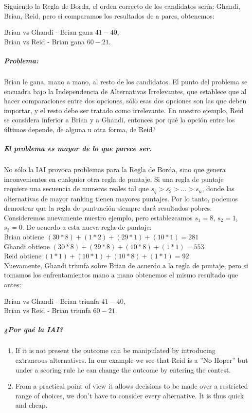 Siguiendo la Regla de Borda, el orden correcto de los candidatos sería: Ghandi, Brian, Reid, pero si comparamos los resultados de a pares, obtenemos:
 
Brian vs Ghandi - Brian gana $41-40$,\\
Brian vs Reid - Brian gana $60-21$. 
\subparagraph{Problema:} Brian le gana, mano a mano, al resto de los candidatos. El punto del problema se encuadra bajo la Independencia de Alternativas Irrelevantes, que establece que al hacer comparaciones entre dos opciones, sólo esas dos opciones son las que deben importar, y el resto debe ser tratado como irrelevante. En nuestro ejemplo, Reid se considera inferior a Brian y a Ghandi, entonces por qué la opción entre los últimos depende, de alguna u otra forma, de Reid? 
\subparagraph{El problema es mayor de lo que parece ser.} No sólo la IAI provoca problemas para la Regla de Borda, sino que genera inconvenientes en cualquier otra regla de puntaje. Si una regla de puntaje requiere una secuencia de numeros reales tal que $s_q>s_2>...>s_n$, donde las alternativas de mayor ranking tienen mayores puntajes. Por lo tanto, podemos demostrar que la regla de puntuación siempre dará resultados pobres.
Consideremos nuevamente nuestro ejemplo, pero establezcamos  $s_1=8$, $s_2=1$, $s_3=0$. De acuerdo a esta nueva regla de puntaje:\\ 
 
Brian obtiene $(30*8)+(1*2)+(29*1)+(10*1)=281$ \\
Ghandi obtiene $(30*8)+(29*8)+(10*8)+(1*1)=553$ \\
Reid obtiene $(1*1)+(10*1)+(10*8)+(1*1)=92$ \\
 
Nuevamente, Ghandi triunfa sobre Brian de acuerdo a la regla de puntaje, pero si tomamos los enfrentamientos mano a mano obtenemos el mismo resultado que antes:
 
Brian vs Ghandi - Brian triunfa  $41-40$, \\
Brian vs Reid - Brian triunfa $60-21$.\\
 
\subparagraph{¿Por qué la IAI?}
\begin{enumerate}
 \item  If it is not present the outcome can be manipulated by introducing extraneous alternatives. In our example we see that Reid is a ”No Hoper” but under a scoring rule he can change the outcome by entering the contest.
 \item From a practical point of view it allows decisions to be made over a restricted range of choices, we don’t have to consider every alternative. It is thus quick and cheap.
\end{enumerate}
 
